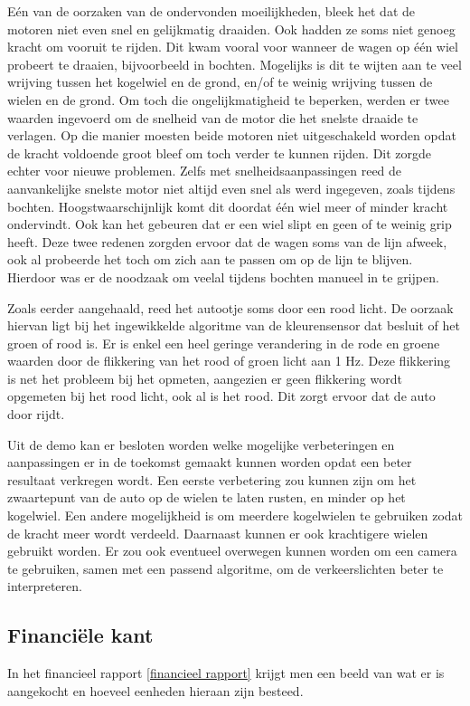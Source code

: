 \documentclass[a4paper,twoside,kulak]{kulakreport} %
\begin{document}
Eén van de oorzaken van de ondervonden moeilijkheden, bleek het dat de motoren niet even snel en gelijkmatig draaiden. Ook hadden ze soms niet genoeg kracht om vooruit te rijden. Dit kwam vooral voor wanneer de wagen op één wiel probeert te draaien, bijvoorbeeld in bochten. Mogelijks is dit te wijten aan te veel wrijving tussen het kogelwiel en de grond, en/of te weinig wrijving tussen de wielen en de grond. Om toch die ongelijkmatigheid te beperken, werden er twee waarden ingevoerd om de snelheid van de motor die het snelste draaide te verlagen. Op die manier moesten beide motoren niet uitgeschakeld worden opdat de kracht voldoende groot bleef om toch verder te kunnen rijden. Dit zorgde echter voor nieuwe problemen. Zelfs met snelheidsaanpassingen reed de aanvankelijke snelste motor niet altijd even snel als werd ingegeven, zoals tijdens bochten. Hoogstwaarschijnlijk komt dit doordat één wiel meer of minder kracht ondervindt. Ook kan het gebeuren dat er een wiel slipt en geen of te weinig grip heeft. Deze twee redenen zorgden ervoor dat de wagen soms van de lijn afweek, ook al probeerde het toch om zich aan te passen om op de lijn te blijven. Hierdoor was er de noodzaak om veelal tijdens bochten manueel in te grijpen.

Zoals eerder aangehaald, reed het autootje soms door een rood licht. De oorzaak hiervan ligt bij het ingewikkelde algoritme van de kleurensensor dat besluit of het groen of rood is. Er is enkel een heel geringe verandering in de rode en groene waarden door de flikkering van het rood of groen licht aan 1 Hz. Deze flikkering is net het probleem bij het opmeten, aangezien er geen flikkering wordt opgemeten bij het rood licht, ook al is het rood. Dit zorgt ervoor dat de auto door rijdt.

Uit de demo kan er besloten worden welke mogelijke verbeteringen en aanpassingen er in de toekomst gemaakt kunnen worden opdat een beter resultaat verkregen wordt. Een eerste verbetering zou kunnen zijn om het zwaartepunt van de auto op de wielen te laten rusten, en minder op het kogelwiel. Een andere mogelijkheid is om meerdere kogelwielen te gebruiken zodat de kracht meer wordt verdeeld. Daarnaast kunnen er ook krachtigere wielen gebruikt worden. Er zou ook eventueel overwegen kunnen worden om een camera te gebruiken, samen met een passend algoritme, om de verkeerslichten beter te interpreteren.

\subsection{Financiële kant} 
In het financieel rapport \ref{financieel rapport} krijgt men een beeld van wat er is aangekocht en hoeveel eenheden hieraan zijn besteed.  
\end{document}

